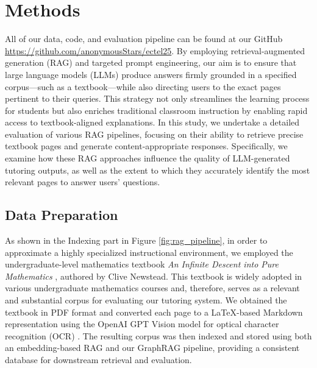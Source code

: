 \documentclass[runningheads]{llncs}
\begin{document}
\section{Methods} \label{sec3}
All of our data, code, and evaluation pipeline can be found at our GitHub \url{https://github.com/anonymousStars/ectel25}.
By employing retrieval-augmented generation (RAG) and targeted prompt engineering, our aim is to ensure that large language models (LLMs) produce answers firmly grounded in a specified corpus—such as a textbook—while also directing users to the exact pages pertinent to their queries. This strategy not only streamlines the learning process for students but also enriches traditional classroom instruction by enabling rapid access to textbook-aligned explanations. In this study, we undertake a detailed evaluation of various RAG pipelines, focusing on their ability to retrieve precise textbook pages and generate content-appropriate responses. Specifically, we examine how these RAG approaches influence the quality of LLM-generated tutoring outputs, as well as the extent to which they accurately identify the most relevant pages to answer users’ questions.


\subsection{Data Preparation}

As shown in the Indexing part in Figure \ref{fig:rag_pipeline}, in order to approximate a highly specialized instructional environment, we employed the undergraduate-level mathematics textbook \emph{An Infinite Descent into Pure Mathematics} \cite{newstead2024infinite}, authored by Clive Newstead. This textbook is widely adopted in various undergraduate mathematics courses and, therefore, serves as a relevant and substantial corpus for evaluating our tutoring system. We obtained the textbook in PDF format and converted each page to a LaTeX-based Markdown representation using the OpenAI GPT Vision model \cite{openaiVision} for optical character recognition (OCR) \cite{ghiriti2024exploring}. The resulting corpus was then indexed and stored using both an embedding-based RAG and our GraphRAG pipeline, providing a consistent database for downstream retrieval and evaluation.

\end{document}

